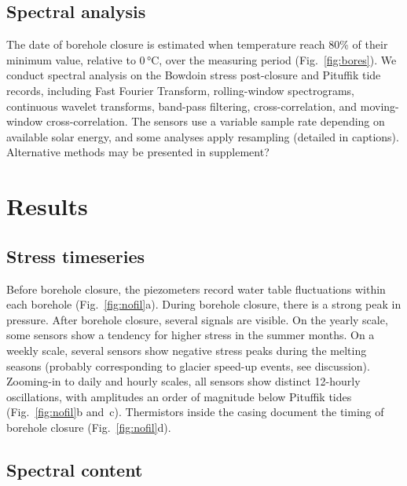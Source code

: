\documentclass[utf8]{article}
\begin{document}
\subsection{Spectral analysis}

    The date of borehole closure is estimated when temperature reach 80\% of
    their minimum value, relative to 0\,°C, over the measuring period
    (Fig.~\ref{fig:bores}). We conduct spectral analysis on the Bowdoin stress
    post-closure and Pituffik tide records, including Fast Fourier Transform,
    rolling-window spectrograms, continuous wavelet transforms, band-pass
    filtering, cross-correlation, and moving-window cross-correlation. The
    sensors use a variable sample rate depending on available solar energy,
    and some analyses apply resampling (detailed in captions). Alternative
    methods may be presented in supplement?

\section{Results}

\subsection{Stress timeseries}

    Before borehole closure, the piezometers record water table fluctuations
    within each borehole (Fig.~\ref{fig:nofil}a). During borehole closure,
    there is a strong peak in pressure. After borehole closure, several signals
    are visible. On the yearly scale, some sensors show a tendency for higher
    stress in the summer months. On a weekly scale, several sensors show
    negative stress peaks during the melting seasons (probably corresponding to
    glacier speed-up events, see discussion). Zooming-in to daily and hourly
    scales, all sensors show distinct 12-hourly oscillations, with amplitudes
    an order of magnitude below Pituffik tides (Fig.~\ref{fig:nofil}b and~c).
    Thermistors inside the casing document the timing of borehole closure
    (Fig.~\ref{fig:nofil}d).

\subsection{Spectral content}
\end{document}
